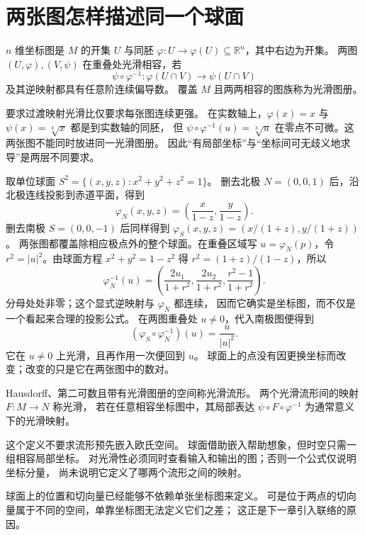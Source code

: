 \section{两张图怎样描述同一个球面}

\begin{definition}[坐标图与光滑相容]
\(n\) 维坐标图是 \(M\) 的开集 \(U\) 与同胚
\(\varphi:U\to\varphi(U)\subseteq\mathbb R^n\)，其中右边为开集。
两图 \((U,\varphi),(V,\psi)\) 在重叠处光滑相容，若
\[
\psi\circ\varphi^{-1}:
\varphi(U\cap V)\longrightarrow\psi(U\cap V)
\]
及其逆映射都具有任意阶连续偏导数。
覆盖 \(M\) 且两两相容的图族称为光滑图册。
\end{definition}

要求过渡映射光滑比仅要求每张图连续更强。
在实数轴上，\(\varphi(x)=x\) 与
\(\psi(x)=\sqrt[3]{x}\) 都是到实数轴的同胚，
但 \(\psi\circ\varphi^{-1}(u)=\sqrt[3]{u}\)
在零点不可微。这两张图不能同时放进同一光滑图册。
因此“有局部坐标”与“坐标间可无歧义地求导”是两层不同要求。

取单位球面 \(S^2=\{(x,y,z):x^2+y^2+z^2=1\}\)。
删去北极 \(N=(0,0,1)\) 后，沿北极连线投影到赤道平面，得到
\[
\varphi_N(x,y,z)=\left(\frac{x}{1-z},\frac{y}{1-z}\right).
\]
删去南极 \(S=(0,0,-1)\) 后同样得到
\(\varphi_S(x,y,z)=(x/(1+z),y/(1+z))\)。
两张图都覆盖除相应极点外的整个球面。在重叠区域写
\(u=\varphi_N(p)\)，令 \(r^2=|u|^2\)。由球面方程
\(x^2+y^2=1-z^2\) 得
\(r^2=(1+z)/(1-z)\)，所以
\[
\varphi_N^{-1}(u)=
\left(\frac{2u_1}{1+r^2},
\frac{2u_2}{1+r^2},
\frac{r^2-1}{1+r^2}\right).
\]
分母处处非零；这个显式逆映射与 \(\varphi_N\) 都连续，
因而它确实是坐标图，而不仅是一个看起来合理的投影公式。
在两图重叠处 \(u\ne0\)，代入南极图便得到
\[
(\varphi_S\circ\varphi_N^{-1})(u)=\frac{u}{|u|^2}.
\]
它在 \(u\ne0\) 上光滑，且再作用一次便回到 \(u\)。
球面上的点没有因更换坐标而改变；改变的只是它在两张图中的数对。

\begin{definition}[光滑流形与光滑映射]
Hausdorff、第二可数且带有光滑图册的空间称光滑流形。
两个光滑流形间的映射 \(F:M\to N\) 称光滑，
若在任意相容坐标图中，其局部表达
\(\psi\circ F\circ\varphi^{-1}\) 为通常意义下的光滑映射。
\end{definition}

这个定义不要求流形预先嵌入欧氏空间。
球面借助嵌入帮助想象，但时空只需一组相容局部坐标。
对光滑性必须同时查看输入和输出的图；否则一个公式仅说明坐标分量，
尚未说明它定义了哪两个流形之间的映射。




球面上的位置和切向量已经能够不依赖单张坐标图来定义。
可是位于两点的切向量属于不同的空间，单靠坐标图无法定义它们之差；
这正是下一章引入联络的原因。
